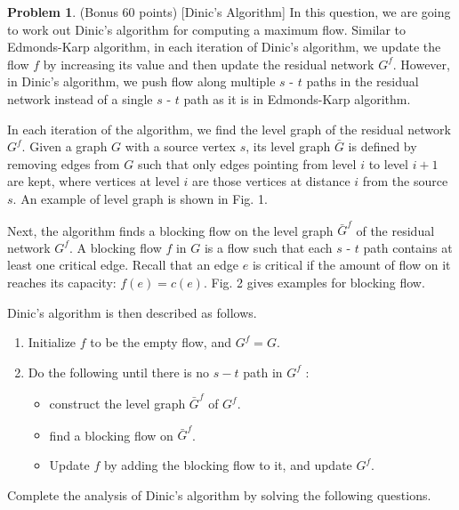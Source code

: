 \documentclass{article}
\theoremstyle{definition}
\newtheorem{prob}{Problem}
\begin{document}
	\begin{prob}
		(Bonus 60 points) [Dinic's Algorithm] In this question, we are going to work out Dinic's algorithm for computing a maximum flow. Similar to Edmonds-Karp algorithm, in each iteration of Dinic's algorithm, we update the flow $f$ by increasing its value and then update the residual network $G^{f}$. However, in Dinic's algorithm, we push flow along multiple $s$ - $t$ paths in the residual network instead of a single $s$ - $t$ path as it is in Edmonds-Karp algorithm.
		
		In each iteration of the algorithm, we find the level graph of the residual network $G^{f}$. Given a graph $G$ with a source vertex $s$, its level graph $\bar{G}$ is defined by removing edges from $G$ such that only edges pointing from level $i$ to level $i+1$ are kept, where vertices at level $i$ are those vertices at distance $i$ from the source $s$. An example of level graph is shown in Fig. 1.
		
		Next, the algorithm finds a blocking flow on the level graph $\bar{G}^{f}$ of the residual network $G^{f}$. A blocking flow $f$ in $G$ is a flow such that each $s$ - $t$ path contains at least one critical edge. Recall that an edge $e$ is critical if the amount of flow on it reaches its capacity: $f(e)=c(e)$. Fig. 2 gives examples for blocking flow.
		
		Dinic's algorithm is then described as follows.
		
		\begin{enumerate}
			\item Initialize $f$ to be the empty flow, and $G^{f}=G$.
			
			\item Do the following until there is no $s-t$ path in $G^{f}$ :
		
			\begin{itemize}
				\item construct the level graph $\bar{G}^{f}$ of $G^{f}$.
				
				\item find a blocking flow on $\bar{G}^{f}$.
				
				\item Update $f$ by adding the blocking flow to it, and update $G^{f}$.
				
			\end{itemize}
		\end{enumerate}
	
		Complete the analysis of Dinic's algorithm by solving the following questions.
		

\end{prob}
\end{document}
